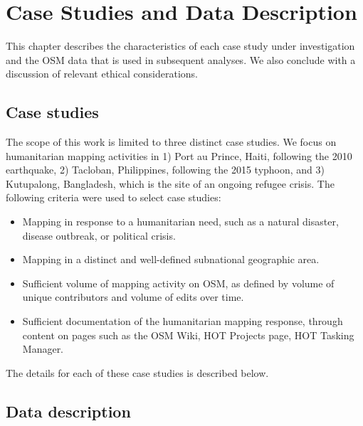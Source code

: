\chapter{Case Studies and Data Description}
\label{chapterlabel3}

This chapter describes the characteristics of each case study under investigation and the OSM data that is used in subsequent analyses. We also conclude with a discussion of relevant ethical considerations. 

\section{Case studies}

The scope of this work is limited to three distinct case studies. We focus on humanitarian mapping activities in 1) Port au Prince, Haiti, following the 2010 earthquake, 2) Tacloban, Philippines, following the 2015 typhoon, and 3) Kutupalong, Bangladesh, which is the site of an ongoing refugee crisis. The following criteria were used to select case studies: 

\begin{itemize}
    \item Mapping in response to a humanitarian need, such as a natural disaster, disease outbreak, or political crisis.
    \item Mapping in a distinct and well-defined subnational geographic area.
	\item Sufficient volume of mapping activity on OSM, as defined by volume of unique contributors and volume of edits over time. 
    \item Sufficient documentation of the humanitarian mapping response, through content on pages such as the OSM Wiki, HOT Projects page, HOT Tasking Manager. 
\end{itemize}

The details for each of these case studies is described below. 



\section{Data description}



    


